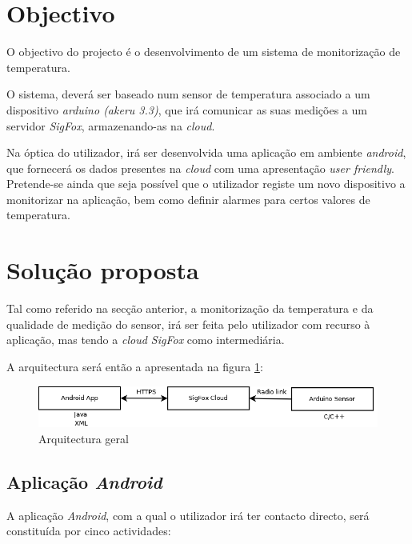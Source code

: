 \documentclass[a4paper]{article}
\begin{document}


\section{Objectivo}

O objectivo do projecto é o desenvolvimento de um sistema de monitorização de temperatura. 

O sistema, deverá ser baseado num sensor de temperatura associado a um dispositivo \textit{arduino (akeru 3.3)}, que irá comunicar as suas medições a um servidor \textit{SigFox}, armazenando-as na \textit{cloud}.

Na óptica do utilizador, irá ser desenvolvida uma aplicação em ambiente \textit{android}, que fornecerá os dados presentes na \textit{cloud} com uma apresentação \textit{user friendly}. Pretende-se ainda que seja possível que o utilizador registe um novo dispositivo a monitorizar na aplicação, bem como definir alarmes para certos valores de temperatura.

\section{Solução proposta}

Tal como referido na secção anterior, a monitorização da temperatura e da qualidade de medição do sensor, irá ser feita pelo utilizador com recurso à aplicação, mas tendo a \textit{cloud SigFox} como intermediária.

A arquitectura será então a apresentada na figura \ref{fig:general}:
\vspace{5mm}

\begin{figure}[hb]
  \centering
  \includegraphics[scale=0.30]{general.png}
  \caption{Arquitectura geral}
  \label{fig:general}
\end{figure}

\subsection{Aplicação \textit{Android}}

A aplicação \textit{Android}, com a qual o utilizador irá ter contacto directo, será constituída por cinco actividades:
\end{document}
